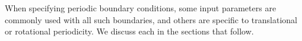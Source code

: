 When specifying periodic boundary conditions, some input parameters are
commonly used with all such boundaries, and others are specific to
translational or rotational periodicity.
%
We discuss each in the sections that follow.














